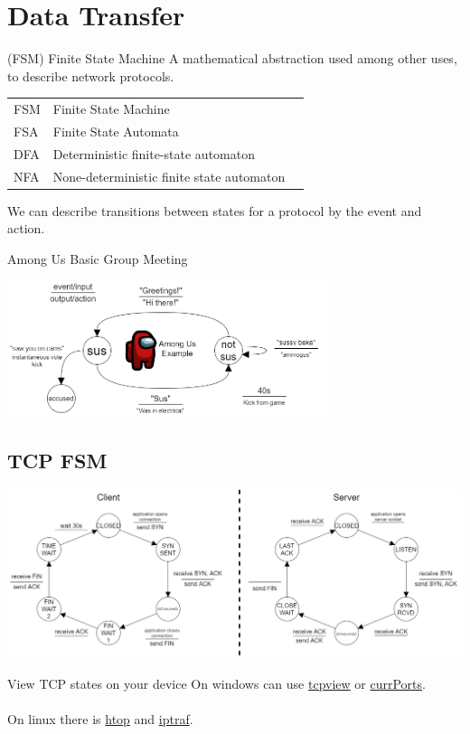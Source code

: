 \section{Data Transfer}
\begin{definitionbox}{(FSM) Finite State Machine}
    A mathematical abstraction used among other uses, to describe network protocols.
    \begin{center}
        \begin{tabular}{l l l}
            FSM & Finite State Machine                      \\
            FSA & Finite State Automata                     \\
            DFA & Deterministic finite-state automaton      \\
            NFA & None-deterministic finite state automaton \\
        \end{tabular}
    \end{center}
\end{definitionbox}
We can describe transitions between states for a protocol by the event and action.
\begin{examplebox}{Among Us Basic Group Meeting}
    \begin{center}\includegraphics[width=0.7\textwidth]{transport_layer/images/example fsm.png}\end{center}
\end{examplebox}
\subsection{TCP FSM}
\begin{center}\includegraphics[width=\textwidth]{transport_layer/images/tcp fsm.png}\end{center}
\begin{sidenotebox}{View TCP states on your device}
    On windows can use  \href{https://docs.microsoft.com/en-us/sysinternals/downloads/tcpview}{tcpview} or \href{https://www.nirsoft.net/utils/cports.html}{currPorts}.
    \\
    \\ On linux there is \href{https://htop.dev/}{htop} and \href{http://iptraf.seul.org/}{iptraf}.
\end{sidenotebox}

